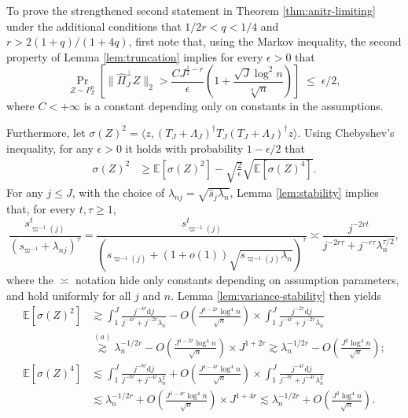 \documentclass[11pt,a4paper]{article}
\renewcommand{\hat}{\widehat}
\theoremstyle{definition}
\theoremstyle{plain}
\theoremstyle{remark}
\newcommand{\ud}{\mathrm d}
\begin{document}
To prove the strengthened second statement in Theorem \ref{thm:anitr-limiting} under the additional conditions that $1/2r<q<1/4$ and $r>2(1+q)/(1+4q)$, first note that, using the Markov inequality, the second property of Lemma \ref{lem:truncation} implies
for every $\epsilon>0$ that 
\begin{equation}
\Pr_{Z\sim P_Z^n}\left[\|\hat\Pi_J^\perp Z\|_2 > \frac{CJ^{\frac{1}{2}-r}}{\epsilon}\left(1+\frac{\sqrt{J}\log^2 n}{\sqrt[4]{n}}\right)\right] \;\leq\; \epsilon/2,
\label{eq:proof-anitr-limiting-6}
\end{equation}
where $C<+\infty$ is a constant depending only on constants in the assumptions.

Furthermore, let $\sigma(Z)^2 = \langle z, (T_J+\Lambda_J)^\dagger T_J(T_J+\Lambda_J)^\dagger z\rangle$.
Using Chebyshev's inequality, for any $\epsilon>0$ it holds with probability $1-\epsilon/2$ that
\begin{align}
\sigma(Z)^2 &\geq \mathbb E[\sigma(Z)^2] - \sqrt{\frac{2}{\epsilon}}\sqrt{\mathbb E[\sigma(Z)^4]}.
\label{eq:proof-anitr-limiting-7}
\end{align}
For any $j\leq J$, with the choice of $\lambda_{nj}=\sqrt{\hat s_j\lambda_n}$, Lemma \ref{lem:stability} implies that, for every $t,\tau\geq 1$, 
$$
\frac{s_{\varpi^{-1}(j)}^t}{(s_{\varpi^{-1}}+\lambda_{nj})^\tau} = \frac{s_{\varpi^{-1}(j)}^t}{(s_{\varpi^{-1}(j)}+(1+o(1))\sqrt{s_{\varpi^{-1}(j)}\lambda_n})^\tau} \asymp \frac{j^{-2rt}}{j^{-2r\tau}+j^{-r\tau}\lambda_n^{\tau/2}},
$$
where the $\asymp$ notation hide only constants depending on assumption parameters, and hold uniformly for all $j$ and $n$. Lemma \ref{lem:variance-stability} then yields
\begin{align*}
\mathbb E[\sigma(Z)^2] &\gtrsim \int_1^J\frac{j^{-4r}\ud j}{j^{-4r}+j^{-2r}\lambda_n} - O\left(\frac{J^{1-2r}\log^4 n}{\sqrt{n}}\right)\times \int_1^J\frac{j^{-2r}\ud j}{j^{-4r}+j^{-2r}\lambda_n}\nonumber\\
&\overset{(a)}{\gtrsim} \lambda_n^{-1/2r} - O\left(\frac{J^{1-2r}\log^4 n}{\sqrt{n}}\right)\times J^{1+2r} \gtrsim  \lambda_n^{-1/2r}- O\left(\frac{J^2\log^4 n}{\sqrt{n}}\right);\\
\mathbb E[\sigma(Z)^4] &\lesssim \int_1^J\frac{j^{-8r}\ud j}{j^{-8r}+j^{-4r}\lambda_n^2} + O\left(\frac{J^{1-4r}\log^4 n}{\sqrt{n}}\right)\times \int_1^J\frac{j^{-4r}\ud j}{j^{-8r}+j^{-4r}\lambda_n^2}\nonumber\\
&\lesssim \lambda_n^{-1/2r}+ O\left(\frac{J^{1-4r}\log^4 n}{\sqrt{n}}\right)\times J^{1+4r} \lesssim \lambda_n^{-1/2r} + O\left(\frac{J^2\log^4 n}{\sqrt{n}}\right).
\end{align*}
\end{document}
